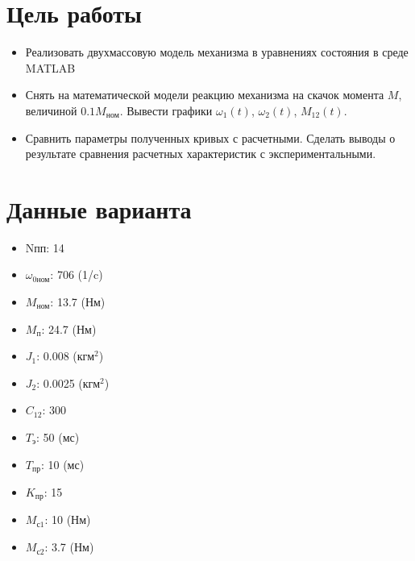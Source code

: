 \section{Цель работы}
\begin{itemize}
    \item Реализовать двухмассовую модель механизма в уравнениях состояния в среде MATLAB
    \item Снять на математической модели реакцию механизма на скачок момента $M$, величиной $0.1M_\text{ном}$.
    Вывести графики $\omega_1(t)$, $\omega_2(t)$, $M_{12}(t)$.
    \item Сравнить параметры полученных кривых с расчетными.
    Сделать выводы о результате сравнения расчетных характеристик с экспериментальными.
\end{itemize}



\section{Данные варианта}
\begin{itemize}
    \item Nпп: 14
    \item $\omega_\text{0ном}$: 706 (1/c)
    \item $M_\text{ном}$: 13.7 (Нм)
    \item $M_\text{п}$: 24.7 (Нм)
    \item $J_\text{1}$: 0.008 (кгм$^2$)
    \item $J_\text{2}$: 0.0025 (кгм$^2$)
    \item $C_\text{12}$: 300
    \item $T_\text{э}$: 50 (мс)
    \item $T_\text{пр}$: 10 (мс)
    \item $K_\text{пр}$: 15
    \item $M_\text{с1}$: 10 (Нм)
    \item $M_\text{с2}$: 3.7 (Нм)
\end{itemize}
\newpage